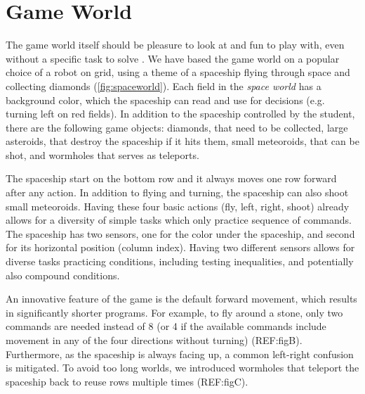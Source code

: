 

\section{Game World}  %
\label{sec:robomission.game-world}

The game world itself should be pleasure to look at and fun to play with,
even without a specific task to solve \cite{book-of-lenses}.
We have based the game world on a popular choice of a robot on grid,
using a theme of a spaceship flying through space and collecting diamonds
(\cref{fig:spaceworld}).
Each field in the \emph{space world} has a background color, which
the spaceship can read and use for decisions (e.g. turning left on red fields).
In addition to the spaceship controlled by the student,
there are the following game objects:
diamonds, that need to be collected,
large asteroids, that destroy the spaceship if it hits them,
small meteoroids, that can be shot,
and wormholes that serves as teleports.

The spaceship start on the bottom row and it always moves one row forward
after any action. %
In addition to flying and turning, the spaceship can also shoot small meteoroids.
Having these four basic actions (fly, left, right, shoot) already allows for a
diversity of simple tasks which only practice sequence of commands.
The spaceship has two sensors, one for the color under the spaceship, and
second for its horizontal position (column index). Having two different sensors allows
for diverse tasks practicing conditions, including testing inequalities, and
potentially also compound conditions.

An innovative feature of the game is the default forward movement,
which results in significantly shorter programs.
For example, to fly around a stone, only two commands are needed %
instead of 8 (or 4 if the available commands include
movement in any of the four directions without turning)
(REF:figB).
Furthermore, as the spaceship is always facing up, a common left-right
confusion \cite{blockly-10-things} is mitigated.
To avoid too long worlds, we introduced wormholes that teleport the
spaceship back to reuse rows multiple times (REF:figC).


